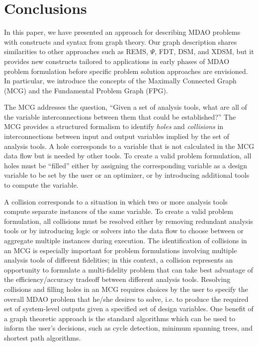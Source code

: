 \section*{Conclusions}
In this paper, we have presented an approach for describing MDAO problems with constructs and syntax from graph theory. 
Our graph description shares similarities to other approaches such as REMS, $\Psi$, FDT, DSM, and XDSM, but it provides new constructs tailored to applications in early phases of MDAO problem formulation before specific problem solution approaches are envisioned. 
In particular, we introduce the concepts of the Maximally Connected Graph (MCG) and the Fundamental Problem Graph (FPG). 

The MCG addresses the question, ``Given a set of analysis tools, what are all of the variable interconnections between them that could be established?''  
The MCG provides a structured formalism to identify \textit{holes} and \textit{collisions} in interconnections between input and output variables implied by the set of analysis tools. 
A hole corresponds to a variable that is not calculated in the MCG data flow but is needed by other tools. 
To create a valid problem formulation, all holes must be ``filled'' either by assigning the corresponding variable as a design variable to be set by the user or an optimizer, or by introducing additional tools to compute the variable.  

A collision corresponds to a situation in which two or more analysis tools compute separate instances of the same variable. 
To create a valid problem formulation, all collisions must be resolved either by removing redundant analysis tools or by introducing logic or solvers into the data flow to choose between or aggregate multiple instances during execution. 
The identification of collisions in an MCG is especially important for problem formulations involving multiple analysis tools of different fidelities; in this context, a collision represents an opportunity to formulate a multi-fidelity problem that can take best advantage of the efficiency/accuracy tradeoff between different analysis tools. 
Resolving collisions and filling holes in an MCG requires choices by the user to specify the overall MDAO problem that he/she desires to solve, i.e. to produce the required set of system-level outputs given a specified set of design variables. 
One benefit of a graph theoretic approach is the standard algorithms which can be used to inform the user's decisions, such as cycle detection, minimum spanning trees, and shortest path algorithms.


